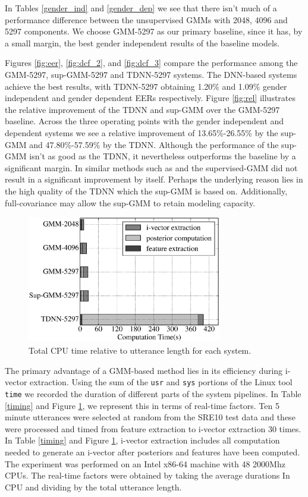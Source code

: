 \documentclass{article}
\begin{document}
In Tables \ref{gender_ind} and \ref{gender_dep} we see that there
isn't much of a performance difference between
the unsupervised GMMs with 2048, 4096 and 5297 components. 
We choose GMM-5297 as our primary baseline, since it has, by a small margin,
the best gender independent results of the baseline models.

Figures \ref{fig:eer}, \ref{fig:dcf_2}, and \ref{fig:dcf_3}
compare the performance among the GMM-5297,
sup-GMM-5297 and TDNN-5297 systems. The DNN-based systems achieve the
best results, with TDNN-5297 obtaining 1.20\% and 1.09\%
gender independent and gender dependent EERs respectively.
Figure \ref{fig:rel} illustrates the relative improvement of the
TDNN and sup-GMM over the GMM-5297 baseline. Across the three
operating points with the gender independent and dependent systems we 
see a relative improvement of 13.65\%-26.55\%
by the sup-GMM and 47.80\%-57.59\% by the TDNN. Although
the performance of the sup-GMM isn't as good as the TDNN,
it nevertheless outperforms the baseline by a significant
margin. In similar methods such as \cite{lei2014} and \cite{omar2010}
the supervised-GMM did not result in a significant improvement by
itself. Perhaps the underlying reason lies in the high quality of
the TDNN which the sup-GMM is based on. Additionally, 
full-covariance may allow the sup-GMM to retain modeling capacity.

\begin{figure}[t]
\centerline{\includegraphics[width=8.5cm]{fig/time}}
\caption{Total CPU time relative to utterance length for each system.}
\label{fig:time}
\end{figure}

The primary advantage of a GMM-based method lies in its
efficiency during i-vector extraction. Using the sum of the \texttt{usr}
and \texttt{sys}
portions of the Linux tool \texttt{time} we recorded the duration of
different parts of the system pipelines. In Table \ref{timing} and
Figure \ref{fig:time}, we represent this in terms of real-time factors.
Ten 5 minute utterances
were selected at random from the SRE10 test data and these were processed
and timed from feature extraction to i-vector extraction 30 times. 
In Table \ref{timing} and
Figure \ref{fig:time}, i-vector extraction
includes all computation needed to generate an i-vector after posteriors and features
have been computed. The experiment was performed on an Intel x86-64 machine with 48 2000Mhz CPUs.
The real-time factors were obtained by taking the average durations In CPU and
dividing by the total utterance length. 
\end{document}
